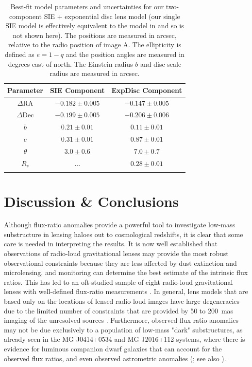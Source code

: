 \documentclass[a4paper,fleqn,usenatbib,useAMS]{mnras}
\begin{document}
\begin{table}
\centering
\caption{Best-fit model parameters and uncertainties for our two-component SIE + exponential disc lens model (our single SIE model is effectively equivalent to the model in \citet{Marlow99} and so is not shown here). The positions are measured in arcsec, relative to the radio position of image A. The ellipticity is defined as $e=1-q$ and the position angles are measured in degrees east of north. The Einstein radius $b$ and disc scale radius are measured in arcsec.}
\begin{tabular}{ccc}
\hline 
Parameter    & SIE Component & ExpDisc Component  \\
\hline
$\Delta$RA	& $-0.182 \pm 0.005$		& $-0.147 \pm 0.005$\\
$\Delta$Dec	& $-0.199 \pm 0.005$		& $-0.206 \pm 0.006$ \\
$b$ 			& $0.21 \pm 0.01$  		& $0.11 \pm 0.01$  \\
$e$	  		& $0.31 \pm 0.01$			& $0.87 \pm 0.01$ \\
$\theta$ 		& $3.0 \pm 0.6$			& $7.0 \pm 0.7$	 \\
$R_s$			& ...  						& $0.28 \pm 0.01$	 \\
\hline
\label{tab:model}
\end{tabular}
\end{table}


\section{Discussion \& Conclusions}

Although flux-ratio anomalies provide a powerful tool to investigate low-mass substructure in lensing haloes out to cosmological redshifts, it is clear that some care is needed in interpreting the results. It is now well established that observations of radio-loud gravitational lenses may provide the most robust observational constraints because they are less affected by dust extinction and microlensing, and monitoring can determine the best estimate of the intrinsic flux ratios. This has led to an oft-studied sample of eight radio-loud gravitational lenses with well-defined flux-ratio measurements \citep{Dalal2002,KD04,Xu15}. In general, lens models that are based only on the locations of lensed radio-loud images have large degeneracies due to the limited number of constraints that are provided by 50 to 200~mas imaging of the unresolved sources \citep[e.g.][]{Ka91}. Furthermore, observed flux-ratio anomalies may not be due exclusively to a population of low-mass "dark" substructures, as already seen in the MG J0414+0534 and MG J2016+112 systems, where there is evidence for luminous companion dwarf galaxies that can account for the observed flux ratios, and even observed astrometric anomalies (\citealt{ros00,chen07,more09}; see also \citealt{mckean07,jackson10}). 
\end{document}
